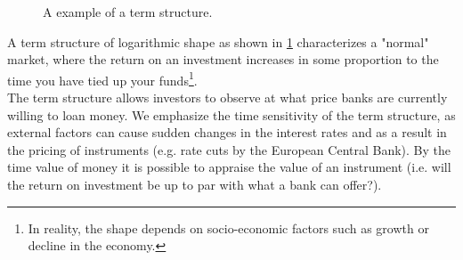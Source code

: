 \begin{figure}[h!]
\begin{center}
\caption{A example of a term structure.}
\label{fig:anc}
\end{center}
\end{figure}

A term structure of logarithmic shape as shown in \ref{fig:anc} characterizes a
"normal" market, where the return on an investment increases in some proportion
to the time you have tied up your funds\footnote{In reality, the shape depends on 
socio-economic factors such as growth or decline in the economy.}.\\

The term structure allows investors to observe at what price banks are
currently willing to loan money. We emphasize the time sensitivity of the term
structure, as external factors can cause sudden changes in the interest
rates and as a result in the pricing of instruments (e.g. rate cuts by the
European Central Bank). By the time value of money it is possible to
appraise the value of an instrument (i.e. will the return on investment
be up to par with what a bank can offer?).\\

